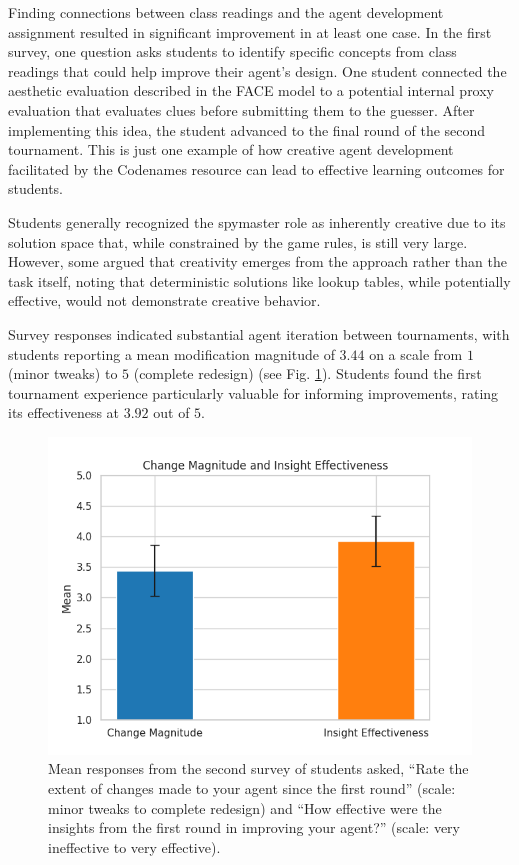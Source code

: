 \documentclass[phd,electronic,oneside,twosidetoc,letterpaper,chaptercenter,parttop,lof]{byumsphd}
\begin{document}
Finding connections between class readings and the agent development assignment resulted in significant improvement in at least one case. In the first survey, one question asks students to identify specific concepts from class readings that could help improve their agent's design. One student connected the aesthetic evaluation described in the FACE model \cite{pease2011face} to a potential internal proxy evaluation that evaluates clues before submitting them to the guesser. After implementing this idea, the student advanced to the final round of the second tournament. This is just one example of how creative agent development facilitated by the Codenames resource can lead to effective learning outcomes for students.

Students generally recognized the spymaster role as inherently creative due to its solution space that, while constrained by the game rules, is still very large. However, some argued that creativity emerges from the approach rather than the task itself, noting that deterministic solutions like lookup tables, while potentially effective, would not demonstrate creative behavior.

Survey responses indicated substantial agent iteration between tournaments, with students reporting a mean modification magnitude of $3.44$ on a scale from $1$ (minor tweaks) to $5$ (complete redesign) (see Fig. \ref{fig:change_insight}). Students found the first tournament experience particularly valuable for informing improvements, rating its effectiveness at $3.92$ out of $5$.

\begin{figure}[tb]
    \centering
    \includegraphics[width=.75\linewidth]{images/codenames/change_insight.png}
    \caption[Student insight change]{Mean responses from the second survey of students asked, ``Rate the extent of changes made to your agent since the first round'' (scale: minor tweaks to complete redesign) and “How effective were the insights from the first round in improving your agent?” (scale: very ineffective to very effective).
}
    \label{fig:change_insight}
\end{figure}
\end{document}
